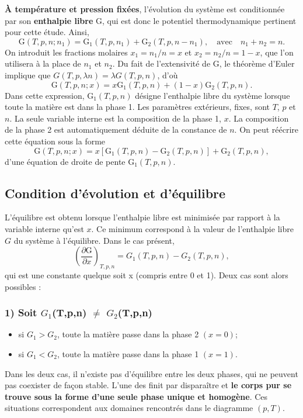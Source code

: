 \documentclass[11pt,a4paper]{report}
\begin{document}
\textbf{\`A température et pression fixées}, l'évolution du système est conditionnée par son \textbf{enthalpie libre} $\text{G}$, qui est donc le potentiel thermodynamique pertinent pour cette étude. Ainsi,
\begin{equation}
\text{G}(T,p,n;n_1)=\text{G}_1(T,p,n_1)+\text{G}_2(T,p,n-n_1),\quad\text{avec}\quad n_1 + n_2 = n.
\end{equation}
On introduit les fractions molaires $x_1 = n_1/n = x$ et $x_2 = n_2/ n = 1 -x$, que l'on utilisera à la place de $n_1$ et $n_2$. Du fait de l'extensivité de $\text{G}$, le théorème d'Euler implique que $G(T,p,\lambda n) = \lambda G(T,p,n)$, d'où
\begin{equation}
	\text{G}(T,p,n;x) = x \text{G}_1(T,p,n) + (1 - x)\text{G}_2(T,p,n).
\end{equation}
Dans cette expression, $\text{G}_1(T,p,n)$ désigne l'enthalpie libre du système lorsque toute la matière est dans la phase 1. Les paramètres extérieurs, fixes, sont $T$, $p$ et $n$. La seule variable interne est la composition de la phase 1, $x$. La composition de la phase 2 est automatiquement déduite de la constance de $n$. On peut réécrire cette équation sous la forme
\begin{equation}
	\boxed{\text{G}(T,p,n;x) = x \left[\text{G}_1(T,p,n) - \text{G}_2(T,p,n)\right] 
	+ \text{G}_2(T,p,n)},
\end{equation}
d'une équation de droite de pente $\text{G}_1(T,p,n)$.

\subsection{Condition d'évolution et d'équilibre}

L'équilibre est obtenu lorsque l'enthalpie libre est minimisée par rapport à la variable interne qu'est $x$. Ce minimum correspond à la valeur de l'enthalpie libre $G$ du système à l'équilibre. Dans le cas présent,
\begin{equation}
	\left(\frac{\partial \text{G}}{\partial x}\right)_{T,p,n} = G_1(T,p,n) - G_2(T,p,n),
\end{equation}
qui est une constante quelque soit x (compris entre 0 et 1). Deux cas sont alors possibles :

\subsubsection*{1\degree) Soit $G_1$(T,p,n) $\neq$ $G_2$(T,p,n)}

\begin{itemize}
	\item si $G_1 > G_2$, toute la matière passe dans la phase 2 $(x = 0)$;	
	\item si $G_1 < G_2$, toute la matière passe dans la phase 1 $(x = 1)$.
\end{itemize}
Dans les deux cas, il n'existe pas d'équilibre entre les deux phases, qui ne peuvent pas coexister de façon stable. L'une des finit par disparaître et \textbf{le corps pur se trouve sous la forme d'une seule phase unique et homogène}. Ces situations correspondent aux domaines rencontrés dans le diagramme $(p,T)$.
\end{document}
